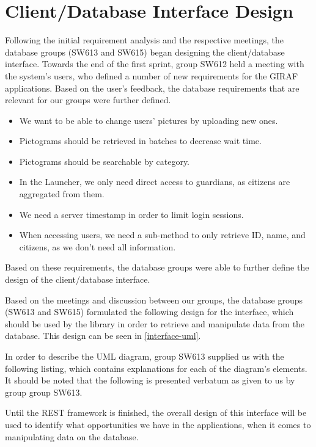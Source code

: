 \section{Client/Database Interface Design}
Following the initial requirement analysis and the respective meetings, the
database groups (SW613 and SW615) began designing the client/database interface.
Towards the end of the first sprint, group SW612 held a meeting with the
system's users, who defined a number of new requirements for the GIRAF
applications. Based on the user's feedback, the database requirements that are
relevant for our groups were further defined.

\begin{itemize}
  \item We want to be able to change users' pictures by uploading new ones.
  \item Pictograms should be retrieved in batches to decrease wait time.
  \item Pictograms should be searchable by category.
  \item In the Launcher, we only need direct access to guardians, as citizens
  are aggregated from them.
  \item We need a server timestamp in order to limit login sessions.
  \item When accessing users, we need a sub-method to only retrieve ID, name, and
  citizens, as we don't need all information.
\end{itemize}

Based on these requirements, the database groups were able to further define
the design of the client/database interface.\nl

Based on the meetings and discussion between our groups, the database groups
(SW613 and SW615) formulated the following design for the interface, which
should be used by the  library in order to retrieve and
manipulate data from the database. This design can be seen in
\autoref{interface-uml}.


In order to describe the UML diagram, group SW613 supplied us with the following
listing, which contains explanations for each of the diagram's elements. It
should be noted that the following is presented verbatum as given to us by group
group SW613.\nl

Until the REST framework is finished, the overall design of this interface
will be used to identify what opportunities we have in the applications, when it
comes to manipulating data on the database.

